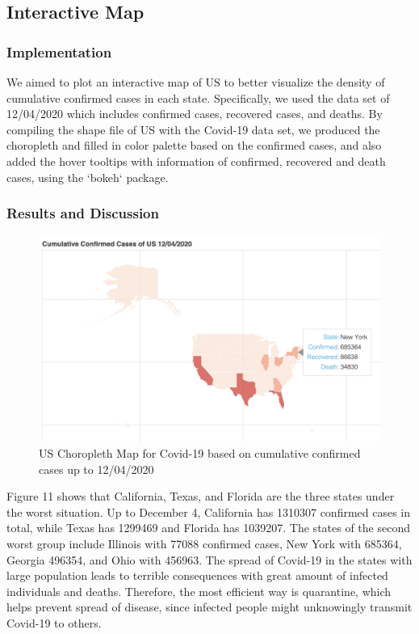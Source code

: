 \documentclass{article}
\begin{document}
\subsection{Interactive Map}


\subsubsection{Implementation}

We aimed to plot an interactive map of US to better visualize the density of cumulative confirmed cases in each state. Specifically, we used the data set of 12/04/2020 which includes confirmed cases, recovered cases, and deaths. By compiling the shape file of US with the Covid-19 data set, we produced the choropleth and filled in color palette based on the confirmed cases, and also added the hover tooltips with information of confirmed, recovered and death cases, using the `bokeh` package.




\subsubsection{Results and Discussion}

\begin{figure}[htp]

\centering
\includegraphics[width=.6\textwidth]{map.png}

\caption{US Choropleth Map for Covid-19 based on cumulative confirmed cases up to 12/04/2020}
\label{fig:figure}
\end{figure}
\FloatBarrier

\noindent
Figure 11 shows that California, Texas, and Florida are the three states under the worst situation. Up to December 4, California has 1310307 confirmed cases in total, while Texas has 1299469 and Florida has 1039207. The states of the second worst group include Illinois with 77088 confirmed cases, New York with 685364, Georgia 496354, and Ohio with 456963. The spread of Covid-19 in the states with large population leads to terrible consequences with great amount of infected individuals and deaths. Therefore, the most efficient way is quarantine, which helps prevent spread of disease, since infected people might unknowingly transmit Covid-19 to others.
\end{document}

